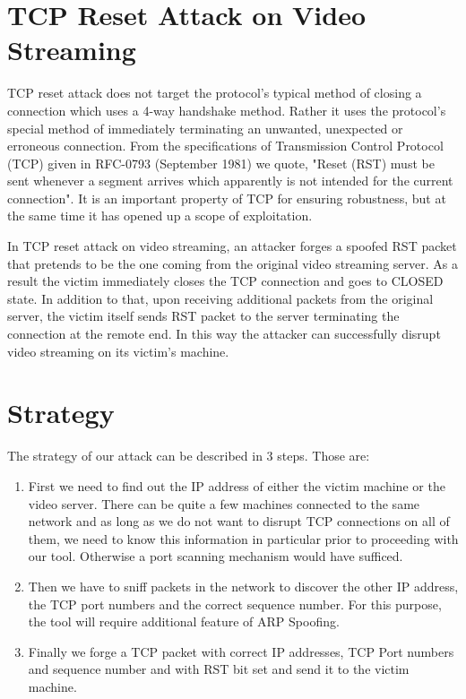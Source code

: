 \documentclass[14pt]{extarticle}
\begin{document}
\section{TCP Reset Attack on Video Streaming}
    TCP reset attack does not target the protocol's typical method of closing a connection which uses a 4-way handshake method. Rather it uses the protocol's special method of immediately terminating an unwanted, unexpected or erroneous connection. From the specifications of Transmission Control Protocol (TCP) given in RFC-0793 (September 1981) we quote, "Reset (RST) must be sent whenever a segment arrives which apparently is not intended for the current connection". It is an important property of TCP for ensuring robustness, but at the same time it has opened up a scope of exploitation. 
    
    In TCP reset attack on video streaming, an attacker forges a spoofed RST packet that pretends to be the one coming from the original video streaming server. As a result the victim immediately closes the TCP connection and goes to CLOSED state. In addition to that, upon receiving additional packets from the original server, the victim itself sends RST packet to the server terminating the connection at the remote end. In this way the attacker can successfully disrupt video streaming on its victim's machine.

\section{Strategy}
   
    The strategy of our attack can be described in 3 steps. Those are:
    \begin{enumerate}
      \item First we need to find out the IP address of either the victim machine or the video server. There can be quite a few machines connected to the same network and as long as we do not want to disrupt TCP connections on all of them, we need to know this information in particular prior to proceeding with our tool. Otherwise a port scanning mechanism would have sufficed. 
      \item Then we have to sniff packets in the network to discover the other IP address, the TCP port numbers and the correct sequence number. For this purpose, the tool will require additional feature of ARP Spoofing.
      \item Finally we forge a TCP packet with correct IP addresses, TCP Port numbers and sequence number and with RST bit set and send it to the victim machine.
    \end{enumerate}
    
\end{document}
